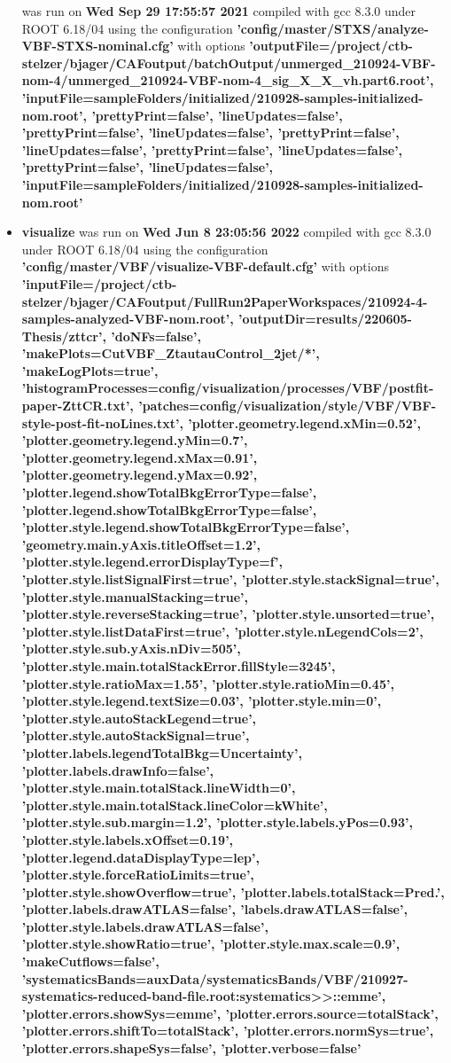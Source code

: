 \documentclass{article}
\begin{document}
\begin{itemize}
was run on \textbf{Wed Sep 29 17:55:57 2021} compiled with gcc 8.3.0 under ROOT 6.18/04 using the configuration \textbf{'config/master/STXS/analyze-VBF-STXS-nominal.cfg'} with options \textbf{'outputFile=/project/ctb-stelzer/bjager/CAFoutput/batchOutput/unmerged\_210924-VBF-nom-4/unmerged\_210924-VBF-nom-4\_sig\_X\_X\_vh.part6.root', 'inputFile=sampleFolders/initialized/210928-samples-initialized-nom.root', 'prettyPrint=false', 'lineUpdates=false', 'prettyPrint=false', 'lineUpdates=false', 'prettyPrint=false', 'lineUpdates=false', 'prettyPrint=false', 'lineUpdates=false', 'prettyPrint=false', 'lineUpdates=false', 'inputFile=sampleFolders/initialized/210928-samples-initialized-nom.root'} \item \textbf{visualize} was run on \textbf{Wed Jun  8 23:05:56 2022} compiled with gcc 8.3.0 under ROOT 6.18/04 using the configuration \textbf{'config/master/VBF/visualize-VBF-default.cfg'} with options \textbf{'inputFile=/project/ctb-stelzer/bjager/CAFoutput/FullRun2PaperWorkspaces/210924-4-samples-analyzed-VBF-nom.root', 'outputDir=results/220605-Thesis/zttcr', 'doNFs=false', 'makePlots=CutVBF\_ZtautauControl\_2jet/*', 'makeLogPlots=true', 'histogramProcesses=config/visualization/processes/VBF/postfit-paper-ZttCR.txt', 'patches=config/visualization/style/VBF/VBF-style-post-fit-noLines.txt', 'plotter.geometry.legend.xMin=0.52', 'plotter.geometry.legend.yMin=0.7', 'plotter.geometry.legend.xMax=0.91', 'plotter.geometry.legend.yMax=0.92', 'plotter.legend.showTotalBkgErrorType=false', 'plotter.legend.showTotalBkgErrorType=false', 'plotter.style.legend.showTotalBkgErrorType=false', 'geometry.main.yAxis.titleOffset=1.2', 'plotter.style.legend.errorDisplayType=f', 'plotter.style.listSignalFirst=true', 'plotter.style.stackSignal=true', 'plotter.style.manualStacking=true', 'plotter.style.reverseStacking=true', 'plotter.style.unsorted=true', 'plotter.style.listDataFirst=true', 'plotter.style.nLegendCols=2', 'plotter.style.sub.yAxis.nDiv=505', 'plotter.style.main.totalStackError.fillStyle=3245', 'plotter.style.ratioMax=1.55', 'plotter.style.ratioMin=0.45', 'plotter.style.legend.textSize=0.03', 'plotter.style.min=0', 'plotter.style.autoStackLegend=true', 'plotter.style.autoStackSignal=true', 'plotter.labels.legendTotalBkg=Uncertainty', 'plotter.labels.drawInfo=false', 'plotter.style.main.totalStack.lineWidth=0', 'plotter.style.main.totalStack.lineColor=kWhite', 'plotter.style.sub.margin=1.2', 'plotter.style.labels.yPos=0.93', 'plotter.style.labels.xOffset=0.19', 'plotter.legend.dataDisplayType=lep', 'plotter.style.forceRatioLimits=true', 'plotter.style.showOverflow=true', 'plotter.labels.totalStack=Pred.', 'plotter.labels.drawATLAS=false', 'labels.drawATLAS=false', 'plotter.style.labels.drawATLAS=false', 'plotter.style.showRatio=true', 'plotter.style.max.scale=0.9', 'makeCutflows=false', 'systematicsBands=auxData/systematicsBands/VBF/210927-systematics-reduced-band-file.root:systematics>>::emme', 'plotter.errors.showSys=emme', 'plotter.errors.source=totalStack', 'plotter.errors.shiftTo=totalStack', 'plotter.errors.normSys=true', 'plotter.errors.shapeSys=false', 'plotter.verbose=false'} \end{itemize}
\end{document}
